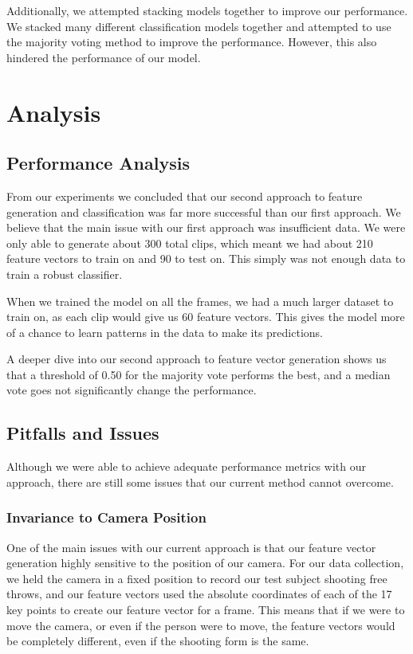 \documentclass[10pt,twocolumn,letterpaper]{article}
\begin{document}
Additionally, we attempted stacking models together to improve our performance. We stacked many different classification models together
and attempted to use the majority voting method to improve the performance. However, this also hindered the performance of our model. 

\section{Analysis}
\subsection{Performance Analysis}
From our experiments we concluded that our second approach to feature generation and classification was
far more successful than our first approach. We believe that the main issue with our first approach was
insufficient data. We were only able to generate about 300 total clips, which meant we had about 210
feature vectors to train on and 90 to test on. This simply was not enough data to train a robust classifier.

When we trained the model on all the frames, we had a much larger dataset to train on, as each clip would give us 60
feature vectors. This gives the model more of a chance to learn patterns in the data to make its predictions. 

A deeper dive into our second approach to feature vector generation shows us that a threshold of 0.50 for the majority vote
performs the best, and a median vote goes not significantly change the performance.

\subsection{Pitfalls and Issues}
Although we were able to achieve adequate performance metrics with our approach, there are still some issues that
our current method cannot overcome.

\subsubsection{Invariance to Camera Position}

One of the main issues with our current approach is that our feature vector generation highly sensitive to the position of our camera. For our data collection,
we held the camera in a fixed position to record our test subject shooting free throws, and our feature vectors used the absolute coordinates of each of the 17 key points
to create our feature vector for a frame. This means that if we were to move the camera, or even if the person were to move, the feature vectors would be completely different, 
even if the shooting form is the same.
\end{document}
